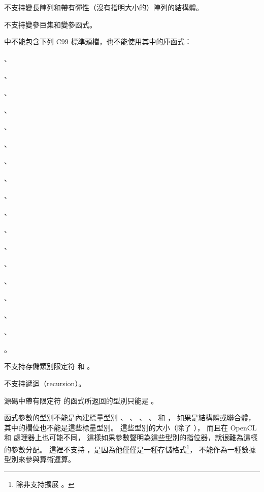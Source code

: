 不支持變長陣列和帶有彈性（沒有指明大小的）陣列的結構體。
\stopitem

\startitem
不支持變參巨集和變參函式。
\stopitem

\startitem
{}中不能包含下列 C99 標準頭檔，也不能使用其中的庫函式：
\startigBase
\item {}、
\item {}、
\item {}、
\item {}、
\item {}、
\item {}、
\item {}、
\item {}、
\item {}、
\item {}、
\item {}、
\item {}、
\item {}、
\item {}、
\item {}、
\item {}、
\item {}、
\item {}
\item {}。
\stopigBase
\stopitem

\startitem
不支持存儲類別限定符  和 。
\stopitem


\startitem
不支持遞迴（recursion）。
\stopitem

\startitem
源碼中帶有限定符  的函式所返回的型別只能是 。
\stopitem

\startitem
{}函式參數的型別不能是內建標量型別
 、 、 、 、
  和 ，
如果是結構體或聯合體，其中的欄位也不能是這些標量型別。
這些型別的大小（除了 ），
而且在 OpenCL  和  處理器上也可能不同，
這樣如果參數聲明為這些型別的指位器，就很難為這樣的參數分配。
這裡不支持 ，是因為他僅僅是一種存儲格式\footnote{
除非支持擴展 。}，
不能作為一種數據型別來參與算術運算。
\stopitem


